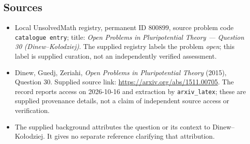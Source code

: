 \documentclass[11pt]{article}
\begin{document}
\subsection{Sources}
\begin{itemize}
\item Local UnsolvedMath registry, permanent ID \(800899\), source problem code \texttt{catalogue entry}; title: \emph{Open Problems in Pluripotential Theory --- Question 30 (Dinew--Ko\l{}odziej)}. The supplied registry labels the problem \emph{open}; this label is supplied curation, not an independently verified assessment.
\item Dinew, Guedj, Zeriahi, \emph{Open Problems in Pluripotential Theory} (2015), Question 30. Supplied source link: \url{https://arxiv.org/abs/1511.00705}. The record reports access on 2026-10-16 and extraction by \texttt{arxiv\_latex}; these are supplied provenance details, not a claim of independent source access or verification.
\item The supplied background attributes the question or its context to Dinew--Ko\l{}odziej. It gives no separate reference clarifying that attribution.
\end{itemize}
\end{document}
